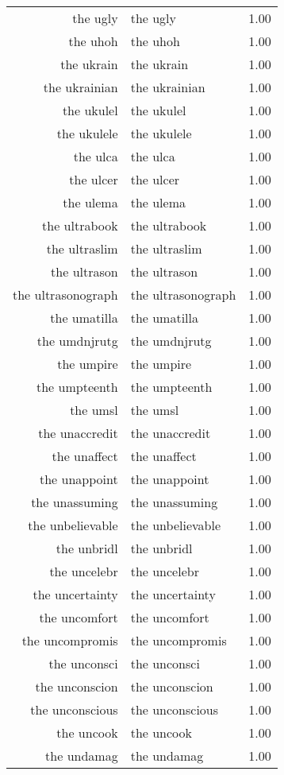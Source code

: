 \begin{table}[ht]
\begin{tabular}{rlr}
  the ugly & the ugly & 1.00 \\ 
  the uhoh & the uhoh & 1.00 \\ 
  the ukrain & the ukrain & 1.00 \\ 
  the ukrainian & the ukrainian & 1.00 \\ 
  the ukulel & the ukulel & 1.00 \\ 
  the ukulele & the ukulele & 1.00 \\ 
  the ulca & the ulca & 1.00 \\ 
  the ulcer & the ulcer & 1.00 \\ 
  the ulema & the ulema & 1.00 \\ 
  the ultrabook & the ultrabook & 1.00 \\ 
  the ultraslim & the ultraslim & 1.00 \\ 
  the ultrason & the ultrason & 1.00 \\ 
  the ultrasonograph & the ultrasonograph & 1.00 \\ 
  the umatilla & the umatilla & 1.00 \\ 
  the umdnjrutg & the umdnjrutg & 1.00 \\ 
  the umpire & the umpire & 1.00 \\ 
  the umpteenth & the umpteenth & 1.00 \\ 
  the umsl & the umsl & 1.00 \\ 
  the unaccredit & the unaccredit & 1.00 \\ 
  the unaffect & the unaffect & 1.00 \\ 
  the unappoint & the unappoint & 1.00 \\ 
  the unassuming & the unassuming & 1.00 \\ 
  the unbelievable & the unbelievable & 1.00 \\ 
  the unbridl & the unbridl & 1.00 \\ 
  the uncelebr & the uncelebr & 1.00 \\ 
  the uncertainty & the uncertainty & 1.00 \\ 
  the uncomfort & the uncomfort & 1.00 \\ 
  the uncompromis & the uncompromis & 1.00 \\ 
  the unconsci & the unconsci & 1.00 \\ 
  the unconscion & the unconscion & 1.00 \\ 
  the unconscious & the unconscious & 1.00 \\ 
  the uncook & the uncook & 1.00 \\ 
  the undamag & the undamag & 1.00 \\ 

\end{tabular}
\end{table}
